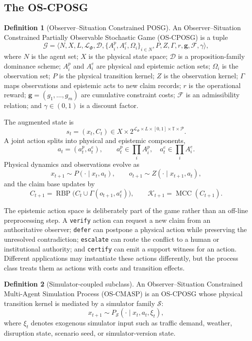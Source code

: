 \documentclass[11pt]{article}
\newcommand{\OSCPOSG}{\mbox{\normalfont\textsc{OS-CPOSG}}}
\newcommand{\OSCMASP}{\mbox{\normalfont\textsc{OS-CMASP}}}
\newcommand{\RBP}{\operatorname{RBP}}
\newcommand{\MCC}{\operatorname{MCC}}
\newcommand{\Lang}{\mathcal L}
\newcommand{\1}{\mathbf{1}}
\theoremstyle{definition}
\newtheorem{definition}{Definition}[section]
\theoremstyle{plain}
\theoremstyle{remark}
\begin{document}
\subsection{The OS-CPOSG}

\begin{definition}[Observer--Situation Constrained POSG]
\label{def:oscposg}
An Observer--Situation Constrained Partially Observable Stochastic Game (\OSCPOSG) is a tuple
\[
\mathcal G=
\langle N,X,L,\Lang_\Phi,\mathcal D,\{A_i^p,A_i^e,\Omega_i\}_{i\in N},P,Z,\Gamma,r,\mathbf g,\mathcal F,\gamma\rangle,
\]
where $N$ is the agent set; $X$ is the physical state space; $\mathcal D$ is a proposition-family dominance scheme; $A_i^p$ and $A_i^e$ are physical and epistemic action sets; $\Omega_i$ is the observation set; $P$ is the physical transition kernel; $Z$ is the observation kernel; $\Gamma$ maps observations and epistemic acts to new claim records; $r$ is the operational reward; $\mathbf g=(g_1,\dots,g_m)$ are cumulative constraint costs; $\mathcal F$ is an admissibility relation; and $\gamma\in(0,1)$ is a discount factor.

The augmented state is
\[
s_t=(x_t,C_t)
\in
X\times 2^{\Lang_\Phi\times L\times[0,1]\times\mathbb T\times\mathcal P}.
\]
A joint action splits into physical and epistemic components,
\[
a_t=(a_t^p,a_t^e),\qquad
 a_t^p\in\prod_i A_i^p,
\quad
 a_t^e\in\prod_i A_i^e.
\]
Physical dynamics and observations evolve as
\[
x_{t+1}\sim P(\cdot\mid x_t,a_t),
\qquad
o_{t+1}\sim Z(\cdot\mid x_{t+1},a_t),
\]
and the claim base updates by
\[
C_{t+1}=\RBP\big(C_t\cup \Gamma(o_{t+1},a_t^e)\big),
\qquad
\mathcal K_{t+1}=\MCC(C_{t+1}).
\]
\end{definition}

The epistemic action space is deliberately part of the game rather than an off-line preprocessing step. A \texttt{verify} action can request a new claim from an authoritative observer; \texttt{defer} can postpone a physical action while preserving the unresolved contradiction; \texttt{escalate} can route the conflict to a human or institutional authority; and \texttt{certify} can emit a support witness for an action. Different applications may instantiate these actions differently, but the process class treats them as actions with costs and transition effects.

\begin{definition}[Simulator-coupled subclass]
\label{def:os-cmasp}
An Observer--Situation Constrained Multi-Agent Simulation Process (\OSCMASP) is an \OSCPOSG{} whose physical transition kernel is mediated by a simulator family $\mathcal S$:
\[
x_{t+1}\sim P_{\mathcal S}(\cdot\mid x_t,a_t,\xi_t),
\]
where $\xi_t$ denotes exogenous simulator input such as traffic demand, weather, disruption state, scenario seed, or simulator-version state.
\end{definition}
\end{document}
